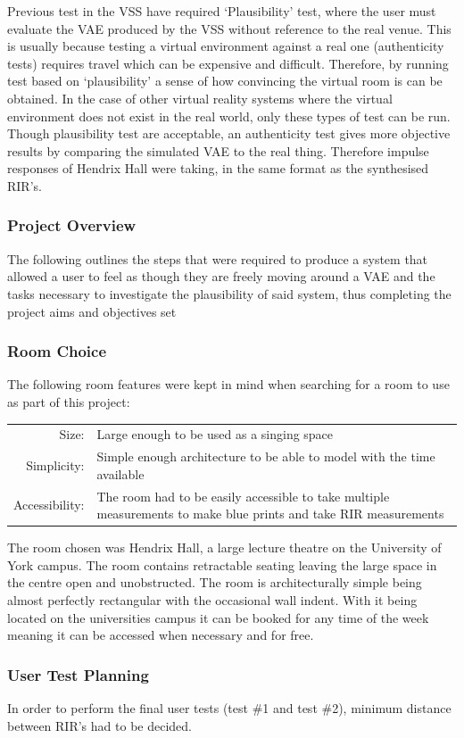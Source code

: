 \documentclass[../../main.tex]{subfiles}
\begin{document}
	Previous test in the VSS have required ‘Plausibility’ test, where the user must evaluate the \ac{VAE} produced by the VSS without reference to the real venue. This is usually because testing a virtual environment against a real one (authenticity tests) requires travel which can be expensive and difficult. Therefore, by running test based on ‘plausibility’ a sense of how convincing the virtual room is can be obtained. In the case of other virtual reality systems where the virtual environment does not exist in the real world, only these types of test can be run. Though plausibility test are acceptable, an authenticity test gives more objective results by comparing the simulated \ac{VAE} to the real thing. Therefore impulse responses of Hendrix Hall were taking, in the same format as the synthesised RIR’s.


		\subsubsection{Project Overview}

			The following outlines the steps that were required to produce a system that allowed a user to feel as though they are freely moving around a \ac{VAE} and the tasks necessary to investigate the plausibility of said system, thus completing the project aims and objectives set

		\subsubsection{Room Choice}

			The following room features were kept in mind when searching for a room to use as part of this project:

			\begin{center}
			\begin{tabular}{r p{12cm}}
				Size: & Large enough to be used as a singing space \\
				Simplicity: & Simple enough architecture to be able to model with the time available \\
				Accessibility: & The room had to be easily accessible to take  multiple measurements to make blue prints and take \ac{RIR} measurements
			\end{tabular}
			\end{center}

			The room chosen was Hendrix Hall, a large lecture theatre on the University of York campus. The room contains retractable seating leaving the large space in the centre open and unobstructed. The room is architecturally simple being almost perfectly rectangular with the occasional wall indent. With it being located on the universities campus it can be booked for any time of the week meaning it can be accessed when necessary and for free.

		\subsubsection{User Test Planning}
		\label{Background:RIRPositions}

			In order to perform the final user tests (test \#1 and test \#2), minimum distance between \ac{RIR}'s had to be decided.
\end{document}
